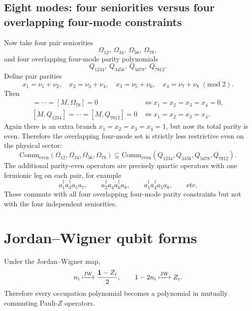 \documentclass[11pt]{article}
\newcommand{\I}{\mathbf{1}}
\newcommand{\even}{\mathrm{even}}
\newcommand{\Comm}{\mathrm{Comm}}
\newcommand{\JW}{\mathrm{JW}}
\newcommand{\modtwo}{\; (\mathrm{mod}\; 2)}
\theoremstyle{definition}
\theoremstyle{remark}
\begin{document}
\subsection{Eight modes: four seniorities versus four overlapping four-mode constraints}
Now take four pair seniorities
\begin{equation}
  \Omega_{12},\ \Omega_{34},\ \Omega_{56},\ \Omega_{78},
\end{equation}
and four overlapping four-mode parity polynomials
\begin{equation}
  Q_{1234},\ Q_{3456},\ Q_{5678},\ Q_{7812}.
\end{equation}
Define pair parities
\begin{equation}
  x_1=\nu_1+\nu_2,
  \quad
  x_2=\nu_3+\nu_4,
  \quad
  x_3=\nu_5+\nu_6,
  \quad
  x_4=\nu_7+\nu_8 \modtwo.
\end{equation}
Then
\begin{align}
  [M,\Omega_{12}]=\cdots=[M,\Omega_{78}]=0
  &\iff x_1=x_2=x_3=x_4=0,
  \\
  [M,Q_{1234}]=\cdots=[M,Q_{7812}]=0
  &\iff x_1=x_2=x_3=x_4.
\end{align}
Again there is an extra branch $x_1=x_2=x_3=x_4=1$, but now its total parity is even. Therefore the overlapping four-mode set is strictly less restrictive even on the physical sector:
\begin{equation}
  \Comm_{\even}(\Omega_{12},\Omega_{34},\Omega_{56},\Omega_{78})
  \subsetneq
  \Comm_{\even}(Q_{1234},Q_{3456},Q_{5678},Q_{7812}).
\end{equation}
The additional parity-even operators are precisely quartic operators with one fermionic leg on each pair, for example
\begin{equation}
  a_1^\dagger a_3^\dagger a_5 a_7,
  \qquad
  a_2^\dagger a_4 a_6^\dagger a_8,
  \qquad
  a_1^\dagger a_4^\dagger a_5 a_8,
  \qquad \text{etc.}
\end{equation}
These commute with all four overlapping four-mode parity constraints but not with the four independent seniorities.

\section{Jordan--Wigner qubit forms}
Under the Jordan--Wigner map,
\begin{equation}
  n_i \xmapsto{\JW} \frac{\I-Z_i}{2},
  \qquad
  1-2n_i \xmapsto{\JW} Z_i.
\end{equation}
Therefore every occupation polynomial becomes a polynomial in mutually commuting Pauli-$Z$ operators.
\end{document}
